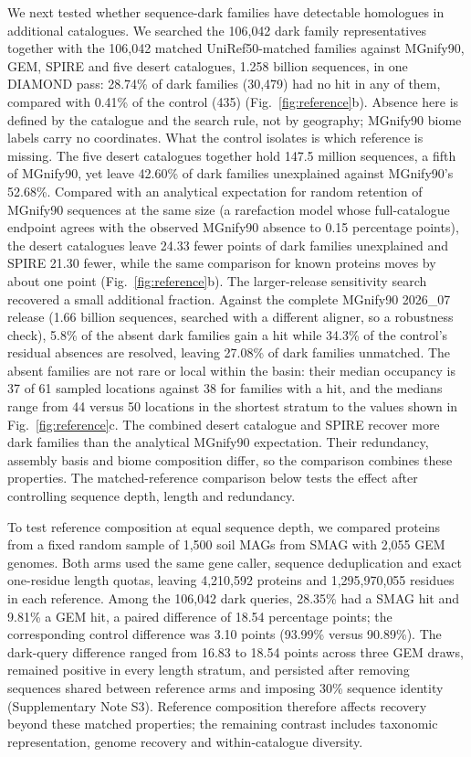 \documentclass[11pt]{article}
\begin{document}
We next tested whether sequence-dark families have detectable homologues in additional catalogues. We searched
the 106{,}042 dark family representatives together with the 106{,}042 matched UniRef50-matched
families against MGnify90, GEM, SPIRE and five desert catalogues, 1.258 billion sequences, in one
DIAMOND pass: 28.74\% of dark families (30{,}479) had no hit in any of them, compared with 0.41\% of
the control (435) (Fig.~\ref{fig:reference}b). Absence here is defined by the catalogue and the
search rule, not by geography; MGnify90 biome labels carry no coordinates. What the control isolates
is which reference is missing. The five desert catalogues together hold 147.5 million sequences, a
fifth of MGnify90, yet leave 42.60\% of dark families unexplained against MGnify90's 52.68\%.
Compared with an analytical expectation for random retention of MGnify90 sequences at the same size (a rarefaction model whose full-catalogue endpoint agrees with the
observed MGnify90 absence to 0.15 percentage points), the desert catalogues leave 24.33 fewer points
of dark families unexplained and SPIRE 21.30 fewer, while the same comparison for known proteins moves
by about one point (Fig.~\ref{fig:reference}b). The larger-release sensitivity search recovered a small additional fraction. Against the complete
MGnify90 2026\_07 release (1.66 billion sequences, searched with a different aligner, so a robustness
check), 5.8\% of
the absent dark families gain a hit while 34.3\% of the control's residual absences are resolved,
leaving 27.08\% of dark families unmatched. The absent families are not rare or local within the
basin: their median occupancy is 37 of 61 sampled locations against 38 for families with a hit, and
the medians range from 44 versus 50 locations in the shortest stratum to the values shown in Fig.~\ref{fig:reference}c. The combined desert catalogue and SPIRE recover more dark families than the analytical MGnify90
expectation. Their redundancy, assembly basis and biome composition differ, so the comparison
combines these properties. The matched-reference comparison below tests the effect after controlling sequence depth, length and redundancy.

To test reference composition at equal sequence depth, we compared proteins from a fixed random
sample of 1{,}500 soil MAGs from SMAG \citep{ma2023smag} with 2{,}055 GEM genomes.
Both arms used the same gene caller, sequence deduplication and exact one-residue length quotas,
leaving 4{,}210{,}592 proteins and 1{,}295{,}970{,}055 residues in each reference.
Among the 106{,}042 dark queries, 28.35\% had a SMAG hit and 9.81\% a GEM hit, a paired difference
of 18.54 percentage points; the corresponding control difference was 3.10 points
(93.99\% versus 90.89\%). The dark-query difference ranged from 16.83 to 18.54 points across
three GEM draws, remained positive in every length stratum, and persisted after removing
sequences shared between reference arms and imposing 30\% sequence identity
(Supplementary Note S3). Reference composition therefore affects recovery beyond these matched
properties; the remaining contrast includes taxonomic representation, genome recovery and
within-catalogue diversity.
\end{document}
